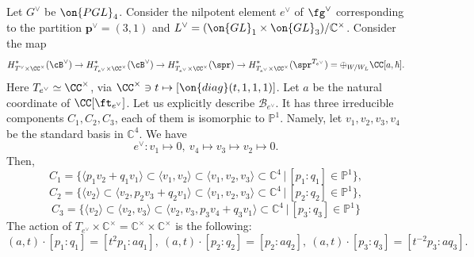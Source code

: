 \documentclass[12pt]{amsart}
\begin{document}



    Let $G^\vee$ be $\on{PGL}_4$. Consider the nilpotent element $e^\vee$ of $\fg^\vee$ corresponding to the partition $\mathbf{p}^\vee=(3,1)$ and $L^\vee=(\on{GL}_1 \times \on{GL}_3)/\mathbb{C}^\times$. Consider the map 
    \begin{equation}\label{equation A2}
    H_{{T^\vee}\times \CC^\times}^*(\cB^\vee)\rightarrow H_{T_{e^\vee}\times \CC^\times}^*(\cB^\vee)\rightarrow H_{T_{e^\vee}\times \CC^\times}^{*}(\spr) \rightarrow H_{T_{e^\vee}\times \CC^\times}^{*}(\spr^{T_{e^\vee}})= \oplus_{W/W_L}\CC[a,\hbar].
    \end{equation} 
    Here $T_{e^\vee} \simeq \CC^\times$, via $\CC^\times \ni t \mapsto [\on{diag}(t,1,1,1)]$. Let $a$ be the natural coordinate of $\CC[\ft_{e^\vee}]$.
    Let us explicitly describe $\mathcal{B}_{e^\vee}$. It has three irreducible components $C_1, C_2, C_3$, each of them is isomorphic to $\mathbb{P}^1$.  
    Namely, let $v_1,v_2,v_3,v_4$ be the standard basis in $\mathbb{C}^4$. We have 
    \begin{equation*}
    e^\vee\colon v_1 \mapsto 0,~ v_4 \mapsto v_3 \mapsto v_2 \mapsto 0.
    \end{equation*}
    Then, 
    \begin{equation*}
    C_1 = \{\langle p_1v_2+q_1v_1\rangle \subset \langle v_1,v_2\rangle \subset \langle v_1,v_2,v_3\rangle \subset \mathbb{C}^4\,|\, [p_1:q_1] \in \mathbb{P}^1\},
    \end{equation*}
    \begin{equation*}
    C_2 = \{\langle v_2\rangle \subset  \langle v_2, p_2v_3+q_2v_1\rangle \subset \langle v_1,v_2,v_3\rangle \subset \mathbb{C}^4\,|\, [p_2:q_2] \in \mathbb{P}^1\},
    \end{equation*}
    \begin{equation*}
    C_3 = \{\langle v_2 \rangle \subset \langle v_2, v_3 \rangle \subset \langle v_2,v_3,p_3v_4+q_3v_1\rangle \subset \mathbb{C}^4\,|\, [p_3:q_3] \in \mathbb{P}^1\}
    \end{equation*}
    The action of $T_{e^\vee} \times \mathbb{C}^\times=\mathbb{C}^\times\times \mathbb{C}^\times$ is the following:
    \begin{equation}\label{act_on_B_e}
    (a,t) \cdot [p_1:q_1]=[t^2p_1:aq_1],~(a,t) \cdot [p_2:q_2] = [p_2:aq_2],~(a,t) \cdot [p_3:q_3] = [t^{-2}p_3:aq_3].
    \end{equation}
\end{document}
